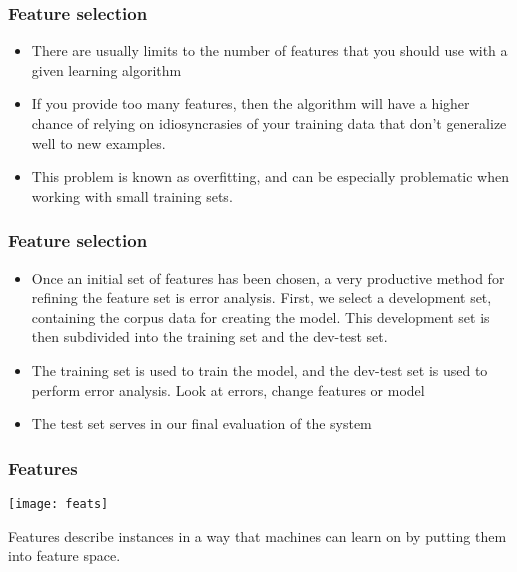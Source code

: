\begin{frame}[fragile]
  \frametitle{Feature selection}
\begin{itemize}
\item There are usually limits to the number of features that you should use with a given learning algorithm
\item If you provide too many features, then the algorithm will have a higher chance of relying on idiosyncrasies of your training data that don't generalize well to new examples. 
\item This problem is known as overfitting, and can be especially problematic when working with small training sets. 
\end{itemize}
\end{frame}

\begin{frame}[fragile]
  \frametitle{Feature selection}
\begin{itemize}
\item Once an initial set of features has been chosen, a very productive method for refining the feature set is error analysis. First, we select a development set, containing the corpus data for creating the model. This development set is then subdivided into the training set and the dev-test set.
\item The training set is used to train the model, and the dev-test set is used to perform error analysis. 
Look at errors, change features or model
\item The test set serves in our final evaluation of the system
\end{itemize}
\end{frame}

\begin{frame}[fragile]\frametitle{Features}
\begin{center}
\texttt{[image: feats]}

\end{center}

Features describe instances in a 
way that machines can learn on by 
putting them into feature space.
\end{frame}


